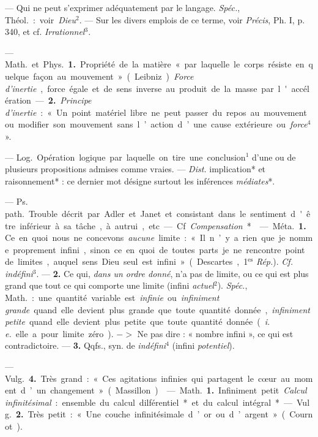 \begin{itemize}[leftmargin=1cm, label=, itemsep=1pt]
 — Qui ne peut s'exprimer adéquatement par le langage.
{\it Spéc.}, \si{Théol.} : voir {\it Dieu}$^2$. — Sur les divers emplois de
ce terme, voir {\it Précis}, Ph. I, p. 340, et cf. {\it Irrationnel}$^3$.

 — \si{Math.} et \si{Phys.} {\bf 1.} Propriété de la matière
« par laquelle le corps résiste en quelque façon au mouvement » (Leibniz).
{\it Force d'inertie}, force égale et de sens inverse au produit de la masse
par l'accélération. — {\bf 2.} {\it Principe d'inertie} : « Un point matériel
libre ne peut passer du repos au mouvement ou modifier son mouvement sans
l’action d’une cause extérieure ou {\it force}$^4$ ».

 — \si{Log.} Opération logique par laquelle on tire une
conclusion$^1$ d’une ou de plusieurs propositions admises comme vraies. —
{\it Dist.} implication* et raisonnement* : ce dernier mot désigne surtout
les inférences {\it médiates}*.

 — \si{Ps. path.} Trouble décrit
par Adler et Janet et consistant dans le sentiment d'être inférieur à sa
tâche, à autrui, etc — Cf {\it Compensation}*.

 — \si{Méta.} {\bf 1.} Ce en quoi nous ne concevons {\it aucune}
limite : « Il n’y a rien que je nomme proprement infini, sinon ce en quoi de
toutes parts je ne rencontre point de limites, auquel sens Dieu seul est
infini » (Descartes, 1$^\text{es}$ {\it Rép.}). {\it Cf.} {\it indéfini}$^3$.
— {\bf 2.} Ce qui, {\it dans un ordre donné}, n'a pas de limite, ou ce qui
est plus grand que tout ce qui comporte une limite (infini {\it actuel}$^2$).
{\it Spéc.}, \si{Math.} : une quantité variable est {\it infinie} ou
{\it infiniment grande} quand elle devient plus grande que toute quantité
donnée, {\it infiniment petite} quand elle devient plus petite que toute
quantité donnée ({\it i. e.} elle a pour limite zéro). $->$ Ne pas dire :
« nombre infini », ce qui est contradictoire. — {\bf 3.} Qqfs., syn. de
{\it indéfini}$^4$ (infini {\it potentiel}).

— \si{Vulg.} {\bf 4.} Très grand : « Ces agitations infinies qui partagent le
cœur au moment d’un changement » (Massillon).

 — \si{Math.} {\bf 1.} Infiniment petit. {\it Calcul
infinitésimal} : ensemble du calcul dilférentiel* et du calcul intégral*.

— \si{Vulg.} {\bf 2.} Très petit : « Une couche infinitésimale d’or ou
d’argent » (Cournot).


\end{itemize}

